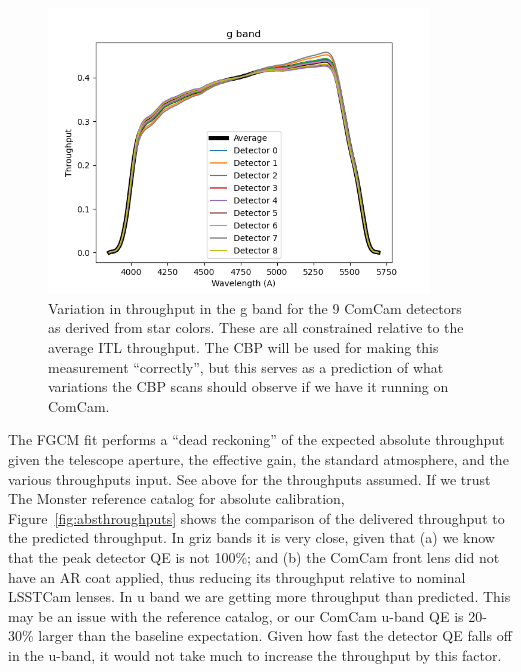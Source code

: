 \begin{figure}
  \begin{center}
    \includegraphics[width=0.9\textwidth]{photometric_calibration_figures/detector_chromaticity_g.png}
  \end{center}
  \caption{Variation in throughput in the g band for the 9 ComCam detectors as
    derived from star colors. These are all constrained relative to the average
    ITL throughput. The CBP will be used for making this measurement
    ``correctly'', but this serves as a prediction of what variations the CBP
    scans should observe if we have it running on ComCam.}
\end{figure}


The FGCM fit performs a ``dead reckoning'' of the expected absolute throughput
given the telescope aperture, the effective gain, the standard atmosphere, and
the various throughputs input.  See above for the throughputs assumed.  If we
trust The Monster reference catalog for absolute calibration,
Figure~\ref{fig:absthroughputs} shows the comparison of the delivered
throughput to the predicted throughput.  In griz bands it is very close, given
that (a) we know that the peak detector QE is not 100\%; and (b) the ComCam
front lens did not have an AR coat applied, thus reducing its throughput
relative to nominal LSSTCam lenses.  In u band we are getting more throughput
than predicted.  This may be an issue with the reference catalog, or our ComCam
u-band QE is 20-30\% larger than the baseline expectation.  Given how fast the
detector QE falls off in the u-band, it would not take much to increase the
throughput by this factor.

